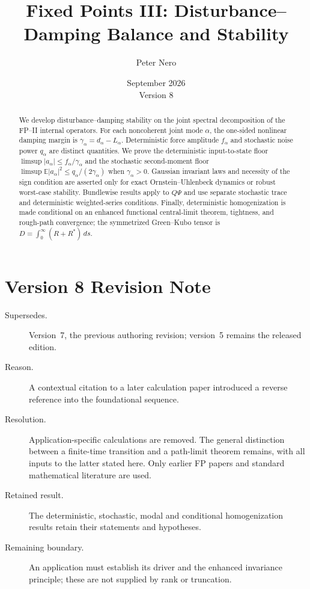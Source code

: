 \documentclass[11pt]{article}
\title{Fixed Points III: Disturbance--Damping Balance and Stability}
\author{Peter Nero}
\date{September 2026\\Version 8}
\begin{document}
\maketitle
\seriestagline

\begin{abstract}
We develop disturbance--damping stability on the joint spectral decomposition
of the FP--II internal operators. For each noncoherent joint mode
$\alpha$, the one-sided nonlinear damping margin is
$\gamma_\alpha=d_\alpha-L_\alpha$. Deterministic force amplitude
$f_\alpha$ and stochastic noise power $q_\alpha$ are distinct quantities. We
prove the deterministic input-to-state floor
$\limsup|a_\alpha|\le f_\alpha/\gamma_\alpha$ and the stochastic
second-moment floor
$\limsup\mathbb E|a_\alpha|^2\le q_\alpha/(2\gamma_\alpha)$ when
$\gamma_\alpha>0$. Gaussian invariant laws and necessity of the sign condition
are asserted only for exact Ornstein--Uhlenbeck dynamics or robust worst-case
stability. Bundlewise results apply to $Q\Psi$ and use separate stochastic trace
and deterministic weighted-series conditions. Finally, deterministic
homogenization is made conditional on an enhanced functional central-limit
theorem, tightness, and rough-path convergence; the symmetrized Green--Kubo tensor
is $D=\int_0^\infty(R+R^\ast)\,ds$.
\end{abstract}

\section*{Version 8 Revision Note}
\begin{description}
\item[Supersedes.] Version~7, the previous authoring revision; version~5
remains the released edition.
\item[Reason.] A contextual citation to a later calculation paper introduced
a reverse reference into the foundational sequence.
\item[Resolution.] Application-specific calculations are removed. The general
distinction between a finite-time transition and a path-limit theorem remains,
with all inputs to the latter stated here. Only earlier FP papers and standard
mathematical literature are used.
\item[Retained result.] The deterministic, stochastic, modal and conditional
homogenization results retain their statements and hypotheses.
\item[Remaining boundary.] An application must establish its driver and the
enhanced invariance principle; these are not supplied by rank or truncation.
\end{description}
\end{document}
